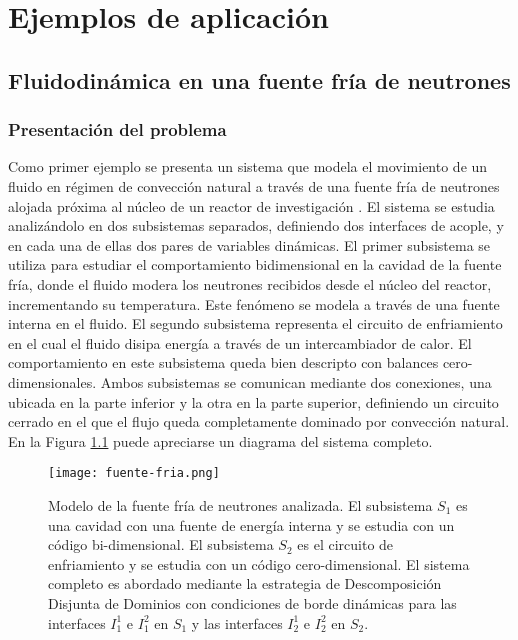 \chapter{Ejemplos de aplicación}
\label{chap3}

\section{Fluidodinámica en una fuente fría de neutrones}
\label{3:ff}

\subsection*{Presentación del problema}
Como primer ejemplo se presenta un sistema que modela el movimiento de un fluido en régimen de convección natural a través de
una fuente fría de neutrones alojada próxima al núcleo de un reactor de investigación \cite{fuente-fria}.
El sistema se estudia analizándolo en dos subsistemas separados,
definiendo dos interfaces de acople,
y en cada una de ellas dos pares de variables dinámicas.
El primer subsistema se utiliza para estudiar el comportamiento bidimensional en la cavidad de la fuente fría,
donde el fluido modera los neutrones recibidos desde el núcleo del reactor,
incrementando su temperatura.
Este fenómeno se modela a través de una fuente interna en el fluido.
El segundo subsistema representa el circuito de enfriamiento en el cual el fluido disipa energía a través de un intercambiador de calor. %
El comportamiento en este subsistema queda bien descripto con balances cero-dimensionales.
Ambos subsistemas se comunican mediante dos conexiones, una ubicada en la parte inferior y la otra en la parte superior,
definiendo un circuito cerrado en el que el flujo queda completamente dominado por convección natural.
En la Figura \ref{esquemaFuenteFria} puede apreciarse un diagrama del sistema completo.

\begin{figure}[ht]
\centering{}\texttt{[image: fuente-fria.png]}
\caption[Modelo de la fuente fría compuesto por un subsistema cero-dimensional y otro subsistema bi-dimensional.]
{Modelo de la fuente fría de neutrones analizada. 
El subsistema $S_1$ es una cavidad con una fuente de energía interna y se estudia con un código bi-dimensional.
El subsistema $S_2$ es el circuito de enfriamiento y se estudia con un código cero-dimensional.
El sistema completo es abordado mediante la estrategia de Descomposición Disjunta de Dominios con condiciones de borde dinámicas
para las interfaces $I_1^1$ e $I_1^2$ en $S_1$ y las interfaces $I_2^1$ e $I_2^2$ en $S_2$.}
\label{esquemaFuenteFria}
\end{figure}


